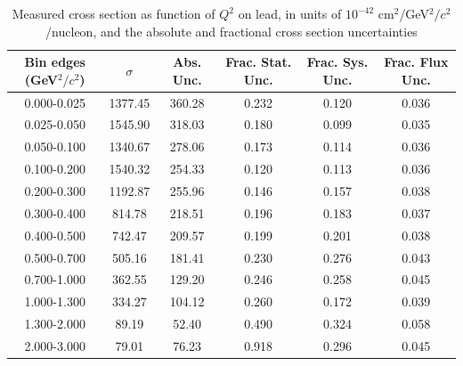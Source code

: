 \documentclass[../main.tex]{subfiles}
\begin{document}
\begin{table}
  \centering
  \renewcommand{\arraystretch}{1.15}
  \caption{Measured cross section as function of $Q^2$ on lead, in units of $10^{-42}$ $\text{cm}^2$/GeV${}^2/c{}^2$/nucleon, and the absolute and fractional cross section uncertainties}
    \begin{tabular}{c||c|c||c|c|c}
      Bin edges (GeV${}^2/c{}^2$) &  $\sigma$  &  Abs. Unc.  &  Frac. Stat. Unc.  &  Frac. Sys. Unc.  &  Frac. Flux Unc. \\
      \hline
      \hline
      0.000-0.025 & 1377.45 & 360.28 & 0.232 & 0.120 & 0.036\\
      0.025-0.050 & 1545.90 & 318.03 & 0.180 & 0.099 & 0.035\\
      0.050-0.100 & 1340.67 & 278.06 & 0.173 & 0.114 & 0.036\\
      0.100-0.200 & 1540.32 & 254.33 & 0.120 & 0.113 & 0.036\\
      0.200-0.300 & 1192.87 & 255.96 & 0.146 & 0.157 & 0.038\\
      0.300-0.400 & 814.78 & 218.51 & 0.196 & 0.183 & 0.037\\
      0.400-0.500 & 742.47 & 209.57 & 0.199 & 0.201 & 0.038\\
      0.500-0.700 & 505.16 & 181.41 & 0.230 & 0.276 & 0.043\\
      0.700-1.000 & 362.55 & 129.20 & 0.246 & 0.258 & 0.045\\
      1.000-1.300 & 334.27 & 104.12 & 0.260 & 0.172 & 0.039\\
      1.300-2.000 & 89.19 & 52.40 & 0.490 & 0.324 & 0.058\\
      2.000-3.000 & 79.01 & 76.23 & 0.918 & 0.296 & 0.045
    \end{tabular}
  \label{tbl:datanucleonnuc82q2a}
\end{table}
\pagebreak
\end{document}
